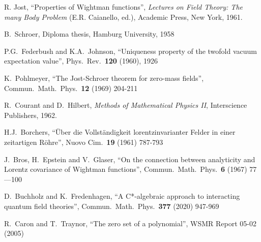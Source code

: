 \documentclass[11pt]{article}
\begin{document}
\begin{thebibliography}{9}
 R. Jost, ``Properties of Wightman functions'',
  \textit{Lectures on Field Theory: The many Body Problem}
  (E.R. Caianello, ed.), Academic Press, New York, 1961.

 B.\ Schroer, Diploma thesis, Hamburg University, 1958

 P.G.\ Federbush and K.A.\ Johnson,
  ``Uniqueness property of the twofold vacuum expectation value'',
  Phys.\ Rev.\  \textbf{120} (1960), 1926 

 K.\ Pohlmeyer, ``The Jost-Schroer theorem for zero-mass
  fields'', Commun.\ Math.\ Phys.\ \textbf{12}  (1969) 204-211

 R.\ Courant and D.\ Hilbert,
  \textit{Methods of Mathematical Physics II},
  Interscience Publishers, 1962. 
  
 H.J.\ Borchers, ``Über die Vollständigkeit
  lorentzinvarianter Felder in einer zeitartigen Röhre'',
  Nuovo Cim.\ \textbf{19} (1961) 787-793

 J.\ Bros, H.\ Epstein and V.\ Glaser,
``On the connection between analyticity and Lorentz
covariance of Wightman functions'', 
Commun.\ Math.\ Phys.\ \textbf{6} (1967) 77—100 

 D.\ Buchholz and K.\ Fredenhagen,
  ``A C*-algebraic approach to interacting quantum field
  theories'', Commun.\ Math.\ Phys.\ \textbf{377}
  (2020) 947-969

 R.\ Caron and T.\ Traynor, ``The zero set of a polynomial'',
WSMR Report 05-02  (2005)
  
  
\end{thebibliography}   
  
\end{document}
